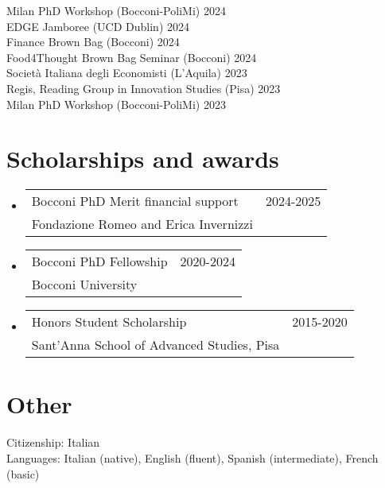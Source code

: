\documentclass[A4,11pt]{article}
\makeatletter
\newcommand{\CVAw}[4]{
	\vspace{-2pt}\item
	\begin{tabular*}{0.97\textwidth}[t]{l@{\extracolsep{\fill}}r}
		#1 & #2 \\
		\small#3 & \small #4 \\
	\end{tabular*}\vspace{-7pt}
}
\newcommand{\CVSubHeadingListStart}{\begin{itemize}[leftmargin=0.5cm, label={}]}
\newcommand{\CVSubHeadingListEnd}{\end{itemize}}
\makeatother
\begin{document}
\smallskip
\hspace{12pt} Milan PhD Workshop (Bocconi-PoliMi) \hfill 2024\\
\smallskip
\hspace{12pt} EDGE Jamboree (UCD Dublin) \hfill 2024\\
\smallskip
\hspace{12pt} Finance Brown Bag (Bocconi) \hfill 2024\\
\smallskip
\hspace{12pt} Food4Thought Brown Bag Seminar (Bocconi) \hfill 2024\\
\smallskip
\hspace{12pt} Società Italiana degli Economisti (L'Aquila) \hfill 2023\\
\smallskip
\hspace{12pt} Regis, Reading Group in Innovation Studies (Pisa) \hfill 2023\\
\smallskip
\hspace{12pt} Milan PhD Workshop (Bocconi-PoliMi) \hfill 2023\\

\vspace{1pt}

\section{Scholarships and awards}

\CVSubHeadingListStart
\CVAw{Bocconi PhD Merit financial support}{2024-2025}{Fondazione Romeo and Erica Invernizzi}{}
\CVAw{Bocconi PhD Fellowship}{2020-2024}{Bocconi University}{}
\CVAw{Honors Student Scholarship}{2015-2020}{Sant’Anna School of Advanced Studies, Pisa}{}

\CVSubHeadingListEnd


\vspace{1pt}

\section{Other}
\hspace{12pt} Citizenship: Italian\\
\smallskip
\hspace{12pt} Languages: Italian (native), English (fluent), Spanish (intermediate), French (basic)
    
\end{document}
